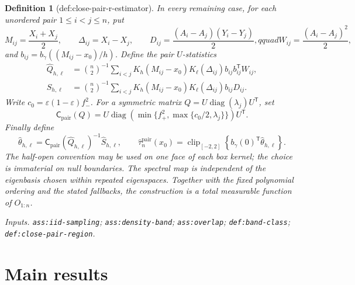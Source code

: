\documentclass{article}
\newtheorem{definition}{Definition}
\begin{document}
\begin{definition}[def:close-pair-r-estimator]
In every remaining case, for each unordered pair \(1\leq i<j\leq n\), put
\[
M_{ij}=\frac{X_i+X_j}{2},\qquad
\Delta_{ij}=X_i-X_j,
\qquad
D_{ij}=\frac{(A_i-A_j)(Y_i-Y_j)}2,qquad
W_{ij}=\frac{(A_i-A_j)^2}2,
\]
and \(b_{ij}=b_\gamma((M_{ij}-x_0)/h)\).  Define the pair
\(U\)-statistics
\[
\begin{aligned}
\widehat Q_{h,\ell}
&=\binom n2^{-1}\sum_{i<j}
K_h(M_{ij}-x_0)K_\ell(\Delta_{ij})
b_{ij}b_{ij}^{\mathsf T}W_{ij},\\
\widehat S_{h,\ell}
&=\binom n2^{-1}\sum_{i<j}
K_h(M_{ij}-x_0)K_\ell(\Delta_{ij})
b_{ij}D_{ij}.
\end{aligned}
\]
Write \(c_0=\varepsilon(1-\varepsilon)f_-^2\).  For a symmetric
matrix \(Q=U\operatorname{diag}(\lambda_j)U^{\mathsf T}\), set
\[
\mathsf C_{\mathrm{pair}}(Q)
=U\operatorname{diag}\!\left(
\min\{f_+^2,\max\{c_0/2,\lambda_j\}\}
\right)U^{\mathsf T}.
\]
Finally define
\[
\widehat\theta_{h,\ell}
=\mathsf C_{\mathrm{pair}}(\widehat Q_{h,\ell})^{-1}
\widehat S_{h,\ell},
\qquad
\widehat\tau_n^{\mathrm{pair}}(x_0)
=\operatorname{clip}_{[-2,2]}
\left\{b_\gamma(0)^{\mathsf T}\widehat\theta_{h,\ell}\right\}.
\]
The half-open convention may be used on one face of each box kernel; the
choice is immaterial on null boundaries.  The spectral map is independent of
the eigenbasis chosen within repeated eigenspaces.  Together with the fixed
polynomial ordering and the stated fallbacks, the construction is a total
measurable function of \(O_{1:n}\).
\par\smallskip\noindent\emph{Inputs.} \texttt{ass:\allowbreak{}iid-\allowbreak{}sampling}; \texttt{ass:\allowbreak{}density-\allowbreak{}band}; \texttt{ass:\allowbreak{}overlap}; \texttt{def:\allowbreak{}band-\allowbreak{}class}; \texttt{def:\allowbreak{}close-\allowbreak{}pair-\allowbreak{}region}.
\end{definition}

\section{Main results}
\end{document}
